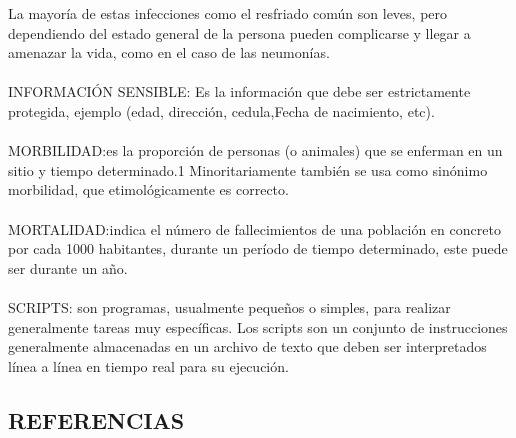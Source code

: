 \documentclass[a4paper,openright,12pt]{book}
\theoremstyle{definition}
\theoremstyle{remark}
\begin{document}
La mayoría de estas infecciones como el resfriado común son leves, pero dependiendo del estado general de la persona pueden complicarse y llegar a amenazar la vida, como en el caso de las neumonías. \\\\
INFORMACIÓN SENSIBLE: Es la información que debe ser estrictamente protegida, ejemplo (edad, dirección, cedula,Fecha de nacimiento, etc).
\\\\
MORBILIDAD:es la proporción de personas (o animales) que se enferman en un sitio y tiempo determinado.1 Minoritariamente también se usa como sinónimo morbilidad, que etimológicamente es correcto.  \\\\
MORTALIDAD:indica el número de fallecimientos de una población en concreto por cada 1000 habitantes, durante un período de tiempo determinado, este puede ser durante un año. \\\\
SCRIPTS: son programas, usualmente pequeños o simples, para realizar generalmente tareas muy específicas. Los scripts son un conjunto de instrucciones generalmente almacenadas en un archivo de texto que deben ser interpretados línea a línea en tiempo real para su ejecución.
\clearpage

\begin{center}
 \chapter{REFERENCIAS}\label{cap.referencias}
\end{center}
\end{document}
